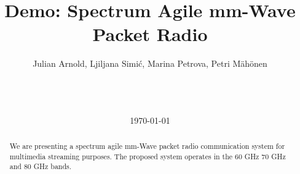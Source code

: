 \documentclass{acm_proc_article-sp}
\begin{document}
\title{Demo: Spectrum Agile mm-Wave Packet Radio}
%
%
%
%
%

%
\author{
%
%
\alignauthor
Julian Arnold, Ljiljana Simi\'{c}, Marina Petrova, Petri M\"ah\"onen\\
       \\
       \\
       \\
}

\date{\today}

\maketitle
\begin{abstract}
We are presenting a spectrum agile mm-Wave packet radio communication system for multimedia streaming purposes.
The proposed system operates in the 60 GHz 70 GHz and 80 GHz bands.
\end{abstract}
\end{document}
